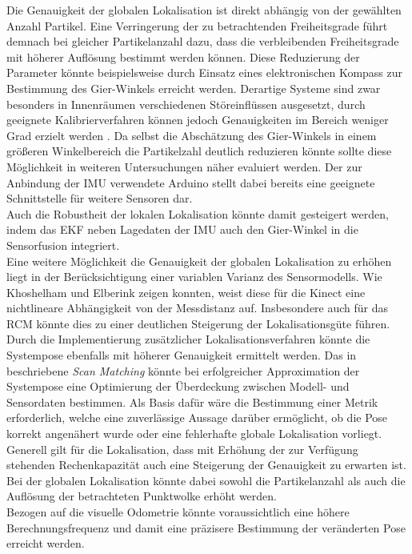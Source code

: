 Die Genauigkeit der globalen Lokalisation ist direkt abhängig von der gewählten Anzahl Partikel. Eine Verringerung der zu betrachtenden Freiheitsgrade führt demnach bei gleicher Partikelanzahl dazu, dass die verbleibenden Freiheitsgrade mit höherer Auflösung bestimmt werden können. Diese Reduzierung der Parameter könnte beispielsweise durch Einsatz eines elektronischen Kompass zur Bestimmung des Gier-Winkels erreicht werden. Derartige Systeme sind zwar besonders in Innenräumen verschiedenen Störeinflüssen ausgesetzt, durch geeignete Kalibrierverfahren können jedoch Genauigkeiten im Bereich weniger Grad erzielt werden \cite{Li2011}. Da selbst die Abschätzung des Gier-Winkels in einem größeren Winkelbereich die Partikelzahl deutlich reduzieren könnte sollte diese Möglichkeit in weiteren Untersuchungen näher evaluiert werden. Der zur Anbindung der IMU verwendete Arduino stellt dabei bereits eine geeignete Schnittstelle für weitere Sensoren dar.\\
Auch die Robustheit der lokalen Lokalisation könnte damit gesteigert werden, indem das EKF neben Lagedaten der IMU auch den Gier-Winkel in die Sensorfusion integriert.\\

Eine weitere Möglichkeit die Genauigkeit der globalen Lokalisation zu erhöhen liegt in der Berücksichtigung einer variablen Varianz des Sensormodells. Wie Khoshelham und Elberink \cite{Khoshelham2012} zeigen konnten, weist diese für die Kinect eine nichtlineare Abhängigkeit von der Messdistanz auf. Insbesondere auch für das RCM könnte dies zu einer deutlichen Steigerung der Lokalisationsgüte führen.\\

Durch die Implementierung zusätzlicher Lokalisationsverfahren könnte die Systempose ebenfalls mit höherer Genauigkeit ermittelt werden. Das in  beschriebene \textit{Scan Matching} könnte bei erfolgreicher Approximation der Systempose eine Optimierung der Überdeckung zwischen Modell- und Sensordaten bestimmen. Als Basis dafür wäre die Bestimmung einer Metrik erforderlich, welche eine zuverlässige Aussage darüber ermöglicht, ob die Pose korrekt angenähert wurde oder eine fehlerhafte globale Lokalisation vorliegt.\\

Generell gilt für die Lokalisation, dass mit Erhöhung der zur Verfügung stehenden Rechenkapazität auch eine Steigerung der Genauigkeit zu erwarten ist. Bei der globalen Lokalisation könnte dabei sowohl die Partikelanzahl als auch die Auflösung der betrachteten Punktwolke erhöht werden.\\
Bezogen auf die visuelle Odometrie könnte voraussichtlich eine höhere Berechnungsfrequenz und damit eine präzisere Bestimmung der veränderten Pose erreicht werden.\\

